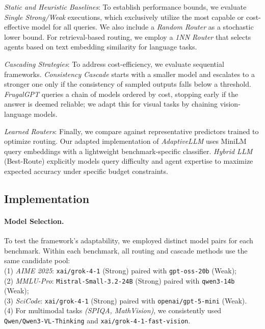 \documentclass[11pt]{article}
\begin{document}
\noindent\emph{Static and Heuristic Baselines}: To establish performance bounds, we evaluate \textit{Single Strong/Weak} executions, which exclusively utilize the most capable or cost-effective model for all queries. We also include a \textit{Random Router} as a stochastic lower bound. For retrieval-based routing, we employ a \textit{1NN Router} that selects agents based on text embedding similarity for language tasks.

\noindent\emph{Cascading Strategies}: To address cost-efficiency, we evaluate sequential frameworks. \textit{Consistency Cascade} \citep{wang2023selfconsistencyimproveschainthought} starts with a smaller model and escalates to a stronger one only if the consistency of sampled outputs falls below a threshold. \textit{FrugalGPT} \citep{chen2023frugalgptuselargelanguage} queries a chain of models ordered by cost, stopping early if the answer is deemed reliable; we adapt this for visual tasks by chaining vision-language models.

\noindent\emph{Learned Routers}: Finally, we compare against representative predictors trained to optimize routing. Our adapted implementation of \textit{AdaptiveLLM} \citep{cheng2025adaptivellm} uses MiniLM query embeddings with a lightweight benchmark-specific classifier. \textit{Hybrid LLM} \citep{ding2024hybridllmcostefficientqualityaware} (Best-Route) explicitly models query difficulty and agent expertise to maximize expected accuracy under specific budget constraints.


\subsection{Implementation}
\label{sec:implementation}

\paragraph{Model Selection.}
To test the framework's adaptability, we employed distinct model pairs for each benchmark. Within each benchmark, all routing and cascade methods use the same candidate pool:\\
(1) \emph{AIME 2025}: \texttt{xai/grok-4-1} (Strong) paired with \texttt{gpt-oss-20b} (Weak);\\
(2) \emph{MMLU-Pro}: \texttt{Mistral-Small-3.2-24B} (Strong) paired with \texttt{qwen3-14b} (Weak);\\
(3) \emph{SciCode}: \texttt{xai/grok-4-1} (Strong) paired with \texttt{openai/gpt-5-mini} (Weak).\\
(4) For multimodal tasks \emph{(SPIQA, MathVision)}, we consistently used \texttt{Qwen/Qwen3-VL-Thinking} and \texttt{xai/grok-4-1-fast-vision}.
\end{document}
